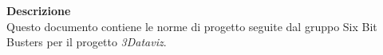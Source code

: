 \begin{titlepage}
\begin{center}
	\large \textbf{Descrizione} \\
	Questo documento contiene le norme di progetto seguite dal gruppo Six Bit Busters
	per il progetto \textit{3Dataviz}.
	
	
	\end{center}
\end{titlepage}
